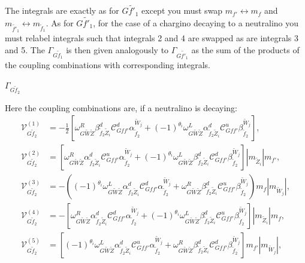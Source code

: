\documentclass[final,3p,times]{elsarticle}
\begin{document}
The integrals are exactly as for $G \tilde{f'}_1$ except you must swap $m_{f'}
\leftrightarrow m_{f}$ and $m_{\tilde{f'}_1} \leftrightarrow
m_{\tilde{f}_1}$. As for $G \tilde{f'}_1$, for the case of a chargino decaying
to a neutralino you must relabel integrals such that integrals 2 and 4 are
swapped as are integrals 3 and 5. 
The $\Gamma_{G \tilde{f}_1}$ is then given analogously to $\Gamma_{G \tilde{f'}_1}$ as the sum of the products of the coupling combinations with corresponding integrals.

\textbf{\underline{$\Gamma_{G \tilde{f}_2}$}}

Here the coupling combinations are, if a neutralino is decaying:
\begin{align}
\mathcal{V}_{G \tilde{f}_2}^{(1)} &= -\frac{1}{2}[\omega_{G \tilde{W} \tilde{Z}}^R \beta_{\tilde{f}_2 \tilde{Z}_i}^{d} \mathcal{C}_{G f f'}^d \alpha_{\tilde{f}_2}^{\tilde{W}_j} + (-1)^{\theta_i}\omega_{G \tilde{W} \tilde{Z}}^L  \alpha_{\tilde{f}_2 \tilde{Z}_i}^{d} \mathcal{C}_{G f f'}^u \beta_{\tilde{f}_2}^{\tilde{W}_j}], \\
\mathcal{V}_{G \tilde{f}_2}^{(2)} &= [\omega_{G \tilde{W} \tilde{Z}}^R \alpha_{\tilde{f}_2 \tilde{Z}_i}^{d} \mathcal{C}_{G f f'}^u \alpha_{\tilde{f}_2}^{\tilde{W}_j} + (-1)^{\theta_i}\omega_{G \tilde{W} \tilde{Z}}^L \beta_{\tilde{f}_2 \tilde{Z}_i}^{d} \mathcal{C}_{G f f'}^d \beta_{\tilde{f}_2}^{\tilde{W}_j}]|m_{\tilde{Z}_i}|m_{f'}, \\
\mathcal{V}_{G \tilde{f}_2}^{(3)} &= -((-1)^{\theta_i}\omega_{G \tilde{W} \tilde{Z}}^L \alpha_{\tilde{f}_2 \tilde{Z}_i}^{d} \mathcal{C}_{G f f'}^d \alpha_{\tilde{f}_2}^{\tilde{W}_j} +  \omega_{G \tilde{W} \tilde{Z}}^R \beta_{\tilde{f}_2 \tilde{Z}_i}^{d} \mathcal{C}_{G f f'}^u \beta_{\tilde{f}_2}^{\tilde{W}_j})m_{f}|m_{\tilde{W}_j}|, \\
\mathcal{V}_{G \tilde{f}_2}^{(4)} &= -[\omega_{G \tilde{W} \tilde{Z}}^R \alpha_{\tilde{f}_2 \tilde{Z}_i}^{d} \mathcal{C}_{G f f'}^d \alpha_{\tilde{f}_2}^{\tilde{W}_j} + (-1)^{\theta_i}\omega_{G \tilde{W} \tilde{Z}}^L \beta_{\tilde{f}_2 \tilde{Z}_i}^{d} \mathcal{C}_{G f f'}^u \beta_{\tilde{f}_2}^{\tilde{W}_j}]|m_{\tilde{Z}_i}|m_{f}, \\
\mathcal{V}_{G \tilde{f}_2}^{(5)} &= [(-1)^{\theta_i}\omega_{G \tilde{W} \tilde{Z}}^L \alpha_{\tilde{f}_2 \tilde{Z}_i}^{d} \mathcal{C}_{G f f'}^u \alpha_{\tilde{f}_2}^{\tilde{W}_j} + \omega_{G \tilde{W} \tilde{Z}}^R \beta_{\tilde{f}_2 \tilde{Z}_i}^{d} \mathcal{C}_{G f f'}^d \beta_{\tilde{f}_2}^{\tilde{W}_j}]m_{f'}|m_{\tilde{W}_j}|, \\

\end{align}
\end{document}
